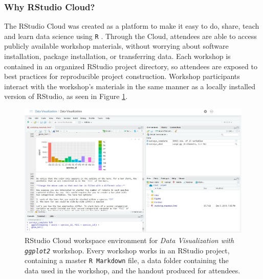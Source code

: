 \documentclass[12pt]{article}
\begin{document}
\subsubsection{Why RStudio Cloud?} 

\quad The RStudio Cloud was created as a platform to make it easy to do, share,
teach and learn data science using \texttt{R} \citep{RStudioCloud}. Through the 
Cloud, attendees are able to access publicly available workshop materials, 
without worrying about software installation, package installation, or
transferring data. Each workshop is contained in an organized RStudio project
directory, so attendees are exposed to best practices for reproducible project 
construction. Workshop participants interact with the workshop's materials in
the same manner as a locally installed version of RStudio, as seen in Figure
\ref{fig:cloud}. 

\begin{figure}[t!]
    \centering
    \includegraphics[width = \textwidth]{images/RStudio_Cloud_blind.png}
    \caption{RStudio Cloud workspace environment for \emph{Data Visualization
    with \texttt{ggplot2}} workshop. Every workshop works in an RStudio project,
    containing a master \texttt{R Markdown} file, a data folder containing the
    data used in the workshop, and the handout produced for attendees.} 
    \label{fig:cloud}
\end{figure}

% 
\end{document}
